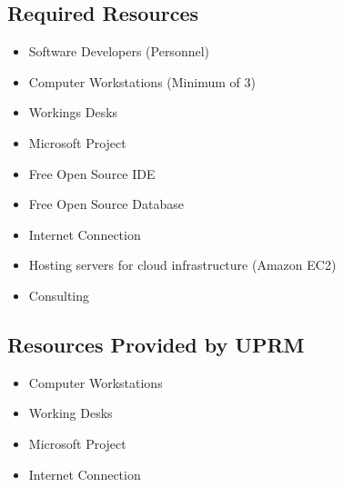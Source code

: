 
\subsection{Required Resources}
\begin{itemize}
\item Software Developers (Personnel)
\item Computer Workstations (Minimum of 3)
\item Workings Desks
\item Microsoft Project
\item Free Open Source IDE
\item Free Open Source Database
\item Internet Connection
\item Hosting servers for cloud infrastructure (Amazon EC2)
\item Consulting
\end{itemize}

\subsection{Resources Provided by UPRM}
\begin{itemize}
\item Computer Workstations
\item Working Desks
\item Microsoft Project
\item Internet Connection

\end{itemize}
